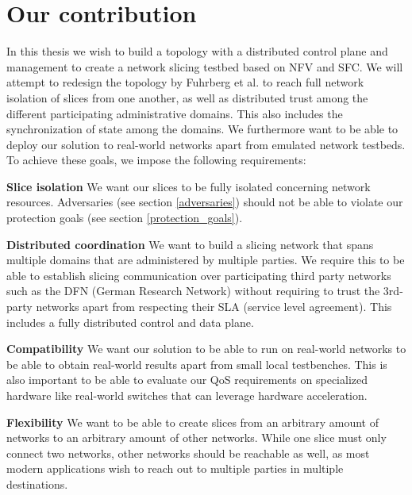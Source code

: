 \section{Our contribution}
In this thesis we wish to build a topology with a distributed control plane and management to create a network slicing testbed based on NFV and SFC. We will attempt to redesign the topology by Fuhrberg et al. to reach full network isolation of slices from one another, as well as distributed trust among the different participating administrative domains. This also includes the synchronization of state among the domains. We furthermore want to be able to deploy our solution to real-world networks apart from emulated network testbeds.
To achieve these goals, we impose the following requirements:

\begin{description}[style=multiline, labelwidth=0.7cm]
    \item[\namedlabel{R1}{R1}] \textbf{Slice isolation} We want our slices to be fully isolated concerning network resources. Adversaries (see section \ref{adversaries}) should not be able to violate our protection goals (see section \ref{protection_goals}).
    \item[\namedlabel{R2}{R2}] \textbf{Distributed coordination} We want to build a slicing network that spans multiple domains that are administered by multiple parties. We require this to be able to establish slicing communication over participating third party networks such as the DFN (German Research Network) without requiring to trust the 3rd-party networks apart from respecting their SLA (service level agreement). This includes a fully distributed control and data plane.
    \item[\namedlabel{R3}{R3}] \textbf{Compatibility} We want our solution to be able to run on real-world networks to be able to obtain real-world results apart from small local testbenches. This is also important to be able to evaluate our QoS requirements on specialized hardware like real-world switches that can leverage hardware acceleration.
    \item[\namedlabel{R4}{R4}] \textbf{Flexibility} We want to be able to create slices from an arbitrary amount of networks to an arbitrary amount of other networks. While one slice must only connect two networks, other networks should be reachable as well, as most modern applications wish to reach out to multiple parties in multiple destinations.
\end{description}

